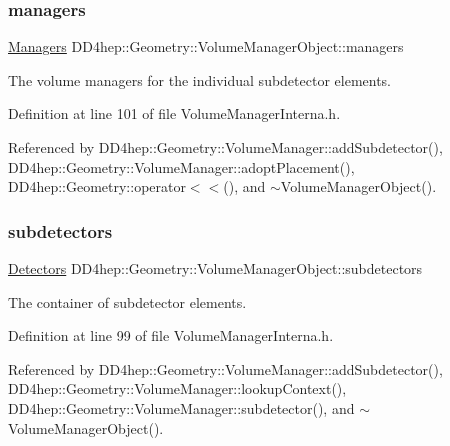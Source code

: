 \subsubsection{\texorpdfstring{managers}{managers}}
{\footnotesize\ttfamily \hyperlink{class_d_d4hep_1_1_geometry_1_1_volume_manager_object_ad98004850761b06cd3a81c68cdcc0087}{Managers} D\+D4hep\+::\+Geometry\+::\+Volume\+Manager\+Object\+::managers}



The volume managers for the individual subdetector elements. 



Definition at line 101 of file Volume\+Manager\+Interna.\+h.



Referenced by D\+D4hep\+::\+Geometry\+::\+Volume\+Manager\+::add\+Subdetector(), D\+D4hep\+::\+Geometry\+::\+Volume\+Manager\+::adopt\+Placement(), D\+D4hep\+::\+Geometry\+::operator$<$$<$(), and $\sim$\+Volume\+Manager\+Object().

\hypertarget{class_d_d4hep_1_1_geometry_1_1_volume_manager_object_aaf80d4d14783bbcdc05eefe7d35519dc}{}\label{class_d_d4hep_1_1_geometry_1_1_volume_manager_object_aaf80d4d14783bbcdc05eefe7d35519dc} 
\subsubsection{\texorpdfstring{subdetectors}{subdetectors}}
{\footnotesize\ttfamily \hyperlink{class_d_d4hep_1_1_geometry_1_1_volume_manager_object_a3148ed79d5f6e5175060519838dbad38}{Detectors} D\+D4hep\+::\+Geometry\+::\+Volume\+Manager\+Object\+::subdetectors}



The container of subdetector elements. 



Definition at line 99 of file Volume\+Manager\+Interna.\+h.



Referenced by D\+D4hep\+::\+Geometry\+::\+Volume\+Manager\+::add\+Subdetector(), D\+D4hep\+::\+Geometry\+::\+Volume\+Manager\+::lookup\+Context(), D\+D4hep\+::\+Geometry\+::\+Volume\+Manager\+::subdetector(), and $\sim$\+Volume\+Manager\+Object().

\hypertarget{class_d_d4hep_1_1_geometry_1_1_volume_manager_object_a52c95661de580da96a5585da48064e58}{}\label{class_d_d4hep_1_1_geometry_1_1_volume_manager_object_a52c95661de580da96a5585da48064e58} 

